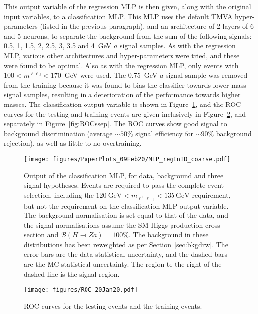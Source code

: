 \documentclass[NOTE, atlasdraft=true, texlive=2017, UKenglish]{\ATLASLATEXPATH atlasdoc}
\begin{document}
This output variable of the regression MLP is then given, along with the original input variables, to a classification MLP. This MLP uses the default \textsc{TMVA} hyper-parameters (listed in the previous paragraph), and an architecture of 2 layers of 6 and 5 neurons, to separate the background from the sum of the following signals: 0.5, 1, 1.5, 2, 2.5, 3, 3.5 and 4~GeV $a$ signal samples. As with the regression MLP, various other architectures and hyper-parameters were tried, and these were found to be optimal. Also as with the regression MLP, only events with $100<m^{\ell\ell\text{j}}<170$~GeV were used. The 0.75~GeV $a$ signal sample was removed from the training because it was found to bias the classifier towards lower mass signal samples, resulting in a deterioration of the performance towards higher masses. The classification output variable is shown in Figure~\ref{fig:mlpclassification}, and the ROC curves for the testing and training events are given inclusively in Figure~\ref{fig:ROCs}, and separately in Figure~\ref{fig:ROCssep}. The ROC curves show good signal to background discrimination (average $\sim 50\%$ signal efficiency for $\sim 90\%$ background rejection), as well as little-to-no overtraining.%


\begin{figure}[!htbp]
  \centering
  \texttt{[image: figures/PaperPlots\_09Feb20/MLP\_regInID\_coarse.pdf]}
  \caption{Output of the classification MLP, for data, background and three signal hypotheses. Events are required to pass the complete event selection, including the $120~\text{GeV}<m_{\ell^+\ell^-\text{j}}<135~\text{GeV}$ requirement, but not the requirement on the classification MLP output variable. The background normalisation is set equal to that of the data, and the signal normalisations assume the SM Higgs production cross section and $\mathcal{B}(H\to Za)=100\%$. The background in these distributions has been reweighted as per Section~\ref{sec:bkgdrw}. The error bars are the data statistical uncertainty, and the dashed bars are the MC statistical uncertainty. The region to the right of the dashed line is the signal region.}
  \label{fig:mlpclassification}
\end{figure}


\begin{figure}[!htbp]
  \centering
  \texttt{[image: figures/ROC\_20Jan20.pdf]}
  \caption{ROC curves for the testing events and the training events.}
  \label{fig:ROCs}
\end{figure}
\end{document}
